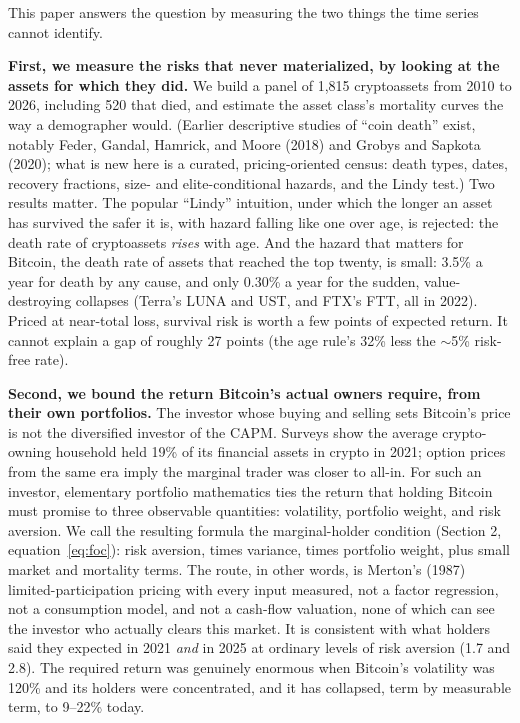 \documentclass[11pt]{article}
\begin{document}
This paper answers the question by measuring the two things the time series cannot identify.

\textbf{First, we measure the risks that never materialized, by looking at the assets for which they did.} We build a panel of 1,815 cryptoassets from 2010 to 2026, including 520 that died, and estimate the asset class's mortality curves the way a demographer would. (Earlier descriptive studies of ``coin death'' exist, notably Feder, Gandal, Hamrick, and Moore (2018) and Grobys and Sapkota (2020); what is new here is a curated, pricing-oriented census: death types, dates, recovery fractions, size- and elite-conditional hazards, and the Lindy test.) Two results matter. The popular ``Lindy'' intuition, under which the longer an asset has survived the safer it is, with hazard falling like one over age, is rejected: the death rate of cryptoassets \emph{rises} with age. And the hazard that matters for Bitcoin, the death rate of assets that reached the top twenty, is small: 3.5\% a year for death by any cause, and only 0.30\% a year for the sudden, value-destroying collapses (Terra's LUNA and UST, and FTX's FTT, all in 2022). Priced at near-total loss, survival risk is worth a few points of expected return. It cannot explain a gap of roughly 27 points (the age rule's 32\% less the $\sim$5\% risk-free rate).

\textbf{Second, we bound the return Bitcoin's actual owners require, from their own portfolios.} The investor whose buying and selling sets Bitcoin's price is not the diversified investor of the CAPM. Surveys show the average crypto-owning household held 19\% of its financial assets in crypto in 2021; option prices from the same era imply the marginal trader was closer to all-in. For such an investor, elementary portfolio mathematics ties the return that holding Bitcoin must promise to three observable quantities: volatility, portfolio weight, and risk aversion. We call the resulting formula the marginal-holder condition (Section 2, equation~\ref{eq:foc}): risk aversion, times variance, times portfolio weight, plus small market and mortality terms. The route, in other words, is Merton's (1987) limited-participation pricing with every input measured, not a factor regression, not a consumption model, and not a cash-flow valuation, none of which can see the investor who actually clears this market. It is consistent with what holders said they expected in 2021 \emph{and} in 2025 at ordinary levels of risk aversion (1.7 and 2.8). The required return was genuinely enormous when Bitcoin's volatility was 120\% and its holders were concentrated, and it has collapsed, term by measurable term, to 9--22\% today.
\end{document}
